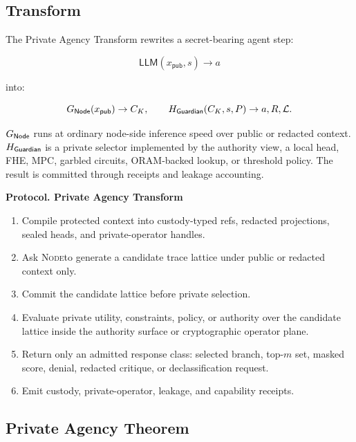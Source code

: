 \documentclass[11pt]{article}
\newcommand{\roletext}[1]{\textnormal{\textsc{#1}}\xspace}
\newcommand{\node}{\ifmmode\mathsf{Node}\else\roletext{Node}\fi}
\newcommand{\guard}{\ifmmode\mathsf{Guardian}\else\roletext{Guardian}\fi}
\newcommand{\leak}{\mathcal{L}}
\newenvironment{protocol}[1]{%
  \medskip
  \noindent\textbf{Protocol. #1}\par\smallskip
  \begingroup
}{%
  \par\endgroup
  \medskip
}
\begin{document}
\subsection{Transform}

The Private Agency Transform rewrites a secret-bearing agent step:

\[
\mathsf{LLM}(x_{\mathsf{pub}}, s) \rightarrow a
\]

\noindent into:

\[
G_{\node}(x_{\mathsf{pub}}) \rightarrow C_K,
\qquad
H_{\guard}(C_K,s,P) \rightarrow a, R, \leak.
\]

\noindent \(G_{\node}\) runs at ordinary node-side inference speed over public
or redacted context. \(H_{\guard}\) is a private selector implemented by the
authority view, a local head, FHE, MPC, garbled circuits, ORAM-backed lookup, or
threshold policy. The result is committed through receipts and leakage
accounting.

\begin{protocol}{Private Agency Transform}
\begin{enumerate}[leftmargin=1.5em]
\item Compile protected context into custody-typed refs, redacted projections,
sealed heads, and private-operator handles.
\item Ask \node to generate a candidate trace lattice under public or redacted
context only.
\item Commit the candidate lattice before private selection.
\item Evaluate private utility, constraints, policy, or authority over the
candidate lattice inside the authority surface or cryptographic operator plane.
\item Return only an admitted response class: selected branch, top-\(m\) set,
masked score, denial, redacted critique, or declassification request.
\item Emit custody, private-operator, leakage, and capability receipts.
\end{enumerate}
\end{protocol}

\subsection{Private Agency Theorem}
\end{document}
